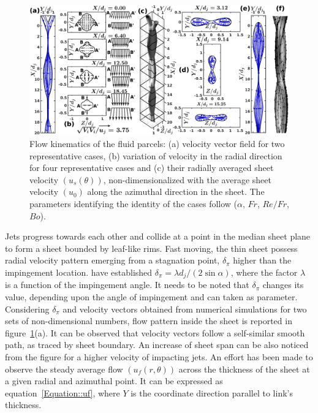 \documentclass[%
 aip,
 sd,%
amsmath,amssymb,
preprint,%
author-year,%
]{revtex4-1}
\begin{document}
\begin{figure}
	\centering
	\includegraphics[width=\linewidth]{Figure5}
	\caption{Flow kinematics of the fluid parcels: (a) velocity vector field for two representative cases, (b) variation of velocity in the radial direction for four representative cases and (c) their radially averaged sheet velocity $\left(u_s(\theta)\right)$, non-dimensionalized with the average sheet velocity $\left(u_0\right)$ along the azimuthal direction in the sheet. The parameters identifying the identity of the cases follow ($\alpha$, $Fr$, $Re/Fr$, $Bo$).}
	\label{Figure::velocityVectors}%
\end{figure}
Jets progress towards each other and collide at a point in the median sheet plane to form a sheet bounded by leaf-like rims. Fast moving, the thin sheet possess radial velocity pattern emerging from a stagnation point, $\delta_\pi$ higher than the impingement location. \cite{inamura2014effect} have established $\delta_\pi = \lambda d_j/(2\sin\alpha)$, where the factor $\lambda$ is a function of the impingement angle. It needs to be noted that $\delta_\pi$ changes its value, depending upon the angle of impingement and can taken as parameter. Considering $\delta_\pi$ and velocity vectors obtained from numerical simulations for two sets of non-dimensional numbers, flow pattern inside the sheet is reported in figure~\ref{Figure::velocityVectors}(a). It can be observed that velocity vectors follow a self-similar smooth path, as traced by sheet boundary. An increase of sheet span can be also noticed from the figure for a higher velocity of impacting jets. An effort has been made to observe the steady average flow $\left(u_f(r,\theta)\right)$ across the thickness of the sheet at a given radial and azimuthal point. It can be expressed as equation~\ref{Equation::uf}, where $Y$ is the coordinate direction parallel to link's thickness. 
\end{document}
